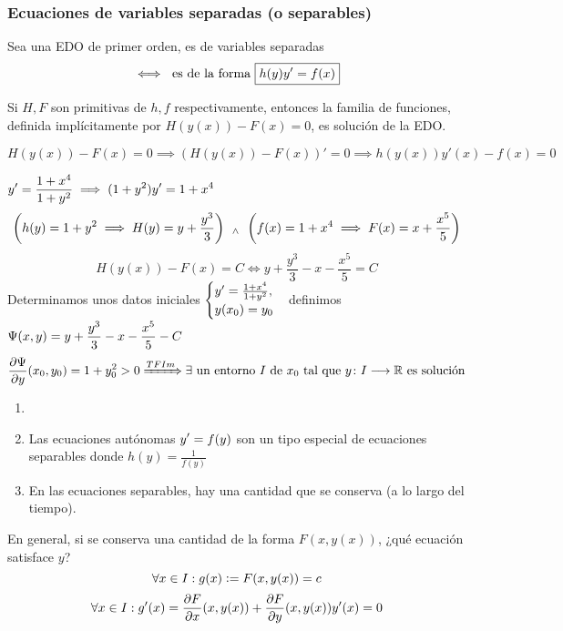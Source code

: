 \documentclass[12pt]{article}
\begin{document}
\subsubsection{Ecuaciones de variables separadas (o separables)}
\begin{defn}
    Sea una EDO de primer orden, es de variables separadas
    \[\iff \text{ es de la forma } \boxed{h(y)y'=f(x)}\]
\end{defn}
\begin{prop}
    Si $H, F$ son primitivas de $h, f$ respectivamente, entonces la familia de funciones, definida implícitamente por $H(y(x))-F(x)=0$, es solución de la EDO.
    \begin{dem}
        \[H(y(x))-F(x)=0 \implies \left(H(y(x))-F(x)\right)'=0 \implies h(y(x))y'(x)-f(x)=0\]
    \end{dem}
\end{prop}
\begin{ejem}
    $\displaystyle y'=\frac{1+x^4}{1+y^2} \implies (1+y^2)y'=1+x^4$
    \[\left(h(y)=1+y^2 \implies H(y)=y + \frac{y^3}{3}\right) \, \; _{\wedge} \; \, \left(f(x)=1+x^4 \implies F(x)=x+\frac{x^5}{5}\right)\]
    \[H(y(x))-F(x)=C \iff y + \frac{y^3}{3}-x-\frac{x^5}{5} = C\]
    Determinamos unos datos iniciales $\displaystyle \begin{cases}
        y'=\frac{1+x^4}{1+y^2}, \\
        y(x_0)=y_0
    \end{cases}$definimos $\displaystyle \Psi(x, y)=y + \frac{y^3}{3}-x-\frac{x^5}{5}-C$
    \[\frac{\partial\Psi}{\partial y}(x_0, y_0) = 1+ y_0^2>0 \xRightarrow{TFIm} \exists \text{ un entorno } I \text{ de } x_0 \text{ tal que } y \colon I \longrightarrow \mathbb{R} \text{ es solución}\]
\end{ejem}

\begin{obs}
    \begin{enumerate}
    \item[] 
        \item Las ecuaciones autónomas $\displaystyle y'=f(y)$ son un tipo especial de ecuaciones separables donde $h(y)=\frac{1}{f(y)}$
        \item En las ecuaciones separables, hay una cantidad que se conserva (a lo largo del tiempo).
    \end{enumerate}
\end{obs}

En general, si se conserva una cantidad de la forma $F(x, y(x))$, ¿qué ecuación satisface $y$?
\[\forall x \in I : g(x)\vcentcolon= F(x, y(x))= c\]
\[\forall x \in I : g'(x)=\pdv{F}{x}(x,y(x)) + \pdv{F}{y}(x, y(x))y'(x)=0\] %
\end{document}
